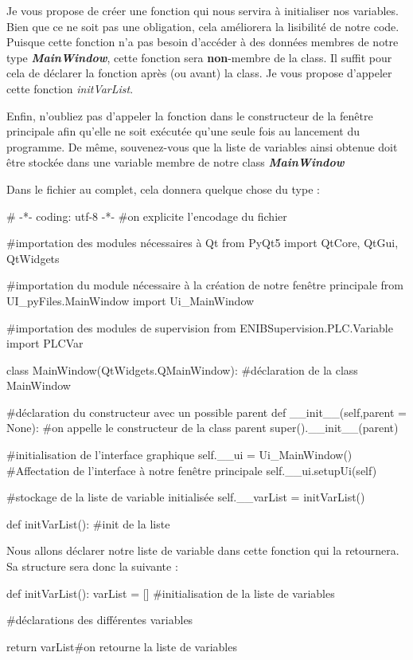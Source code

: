 \documentclass[12pt]{report}    %
\newcommand{\bold}[1]{{\bfseries #1}}
\newcommand{\italic}[1]{{\itshape #1}}
\newcommand{\ib}[1]{{\bfseries\itshape #1}}
\newcommand{\smallSkip}{\vskip 0.5cm}
\begin{document}
Je vous propose de créer une fonction qui nous servira à initialiser nos variables. Bien que ce ne soit pas une obligation, cela améliorera la lisibilité de notre code.\newline
Puisque cette fonction n'a pas besoin d'accéder à des données membres de notre type \ib{MainWindow}, cette fonction sera \bold{non}-membre de la class.\newline
Il suffit pour cela de déclarer la fonction après (ou avant) la class.\newline
Je vous propose d'appeler cette fonction \italic{initVarList}.\smallSkip

Enfin, n'oubliez pas d'appeler la fonction dans le constructeur de la fenêtre principale afin qu'elle ne soit exécutée qu'une seule fois au lancement du programme. De même, souvenez-vous que la liste de variables ainsi obtenue doit être stockée dans une variable membre de notre class \ib{MainWindow}\smallSkip

Dans le fichier au complet, cela donnera quelque chose du type :
\begin{pyCode}
# -*- coding: utf-8 -*-
#on explicite l’encodage du fichier

#importation des modules nécessaires à Qt
from PyQt5 import QtCore, QtGui, QtWidgets

#importation du module nécessaire à la création de notre fenêtre principale
from UI_pyFiles.MainWindow import Ui_MainWindow

#importation des modules de supervision
from ENIBSupervision.PLC.Variable import PLCVar

class MainWindow(QtWidgets.QMainWindow): #déclaration de la class MainWindow

	#déclaration du constructeur avec un possible parent
	def __init__(self,parent = None):
		#on appelle le constructeur de la class parent
		super().__init__(parent)

		#initialisation de l'interface graphique
		self.__ui = Ui_MainWindow()
		#Affectation de l'interface à notre fenêtre principale
		self.__ui.setupUi(self)
		
		#stockage de la liste de variable initialisée
		self.__varList = initVarList()


def initVarList():
	#init de la liste

\end{pyCode}

Nous allons déclarer notre liste de variable dans cette fonction qui la retournera. Sa structure sera donc la suivante :
\begin{pyCode}
def initVarList():
	varList = [] #initialisation de la liste de variables

	#déclarations des différentes variables

	return varList#on retourne la liste de variables
\end{pyCode}
\end{document}
